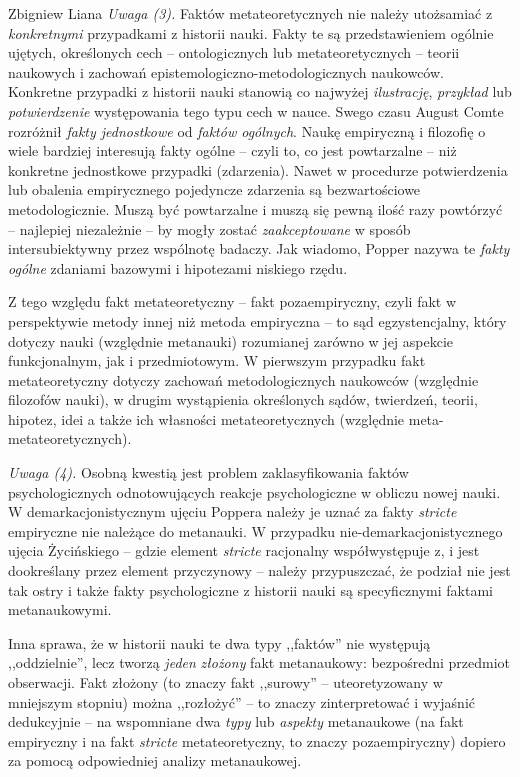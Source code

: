\begin{artplenv}{Zbigniew Liana}
\textit{Uwaga (3).} Faktów metateoretycznych nie należy utożsamiać z \textit{konkretnymi} przypadkami z historii nauki.
Fakty te są przedstawieniem ogólnie ujętych, określonych cech -- ontologicznych lub metateoretycznych -- teorii naukowych
i zachowań epistemologiczno-metodologicznych naukowców. Konkretne przypadki z historii nauki stanowią co najwyżej
\textit{ilustrację}, \textit{przykład} lub \textit{potwierdzenie} występowania tego typu cech w nauce. Swego czasu August
Comte rozróżnił \textit{fakty jednostkowe} od \textit{faktów ogólnych}. Naukę empiryczną i filozofię o wiele bardziej
interesują fakty ogólne -- czyli to, co jest powtarzalne -- niż konkretne jednostkowe przypadki (zdarzenia). Nawet w
procedurze potwierdzenia lub obalenia empirycznego pojedyncze zdarzenia są bezwartościowe metodologicznie. Muszą być
powtarzalne i muszą się pewną ilość razy powtórzyć -- najlepiej niezależnie -- by mogły zostać \textit{zaakceptowane} w sposób
intersubiektywny przez wspólnotę badaczy. Jak wiadomo, Popper nazywa te \textit{fakty ogólne} zdaniami bazowymi i hipotezami
niskiego rzędu.

Z tego względu fakt metateoretyczny -- fakt pozaempiryczny, czyli fakt w perspektywie metody innej niż metoda empiryczna
-- to sąd egzystencjalny, który dotyczy nauki (względnie metanauki) rozumianej zarówno w jej aspekcie funkcjonalnym,
jak i przedmiotowym. W pierwszym przypadku fakt metateoretyczny dotyczy zachowań metodologicznych naukowców (względnie
filozofów nauki), w drugim wystąpienia określonych sądów, twierdzeń, teorii, hipotez, idei a także ich własności
metateoretycznych (względnie meta-metateoretycznych).

\textit{Uwaga (4).} Osobną kwestią jest problem zaklasyfikowania faktów psychologicznych odnotowujących reakcje
psychologiczne w obliczu nowej nauki. W demarkacjonistycznym ujęciu Poppera należy je uznać za fakty \textit{stricte}
empiryczne nie należące do metanauki. W przypadku nie-demarkacjonistycznego ujęcia Życińskiego -- gdzie element
\textit{stricte} racjonalny współwystępuje z, i jest dookreślany przez element przyczynowy -- należy przypuszczać, że
podział nie jest tak ostry i także fakty psychologiczne z historii nauki są specyficznymi faktami metanaukowymi.

Inna sprawa, że w historii nauki te dwa typy ,,faktów'' nie występują ,,oddzielnie'', lecz tworzą \textit{jeden}
\textit{złożony} fakt metanaukowy: bezpośredni przedmiot obserwacji. Fakt złożony (to znaczy fakt ,,surowy'' --
uteoretyzowany w mniejszym stopniu) można ,,rozłożyć'' -- to znaczy zinterpretować i wyjaśnić dedukcyjnie -- na wspomniane
dwa \textit{typy} lub\textit{ aspekty} metanaukowe (na fakt empiryczny i na fakt \textit{stricte} metateoretyczny, to znaczy
pozaempiryczny) dopiero za pomocą odpowiedniej analizy metanaukowej.


\end{artplenv}
